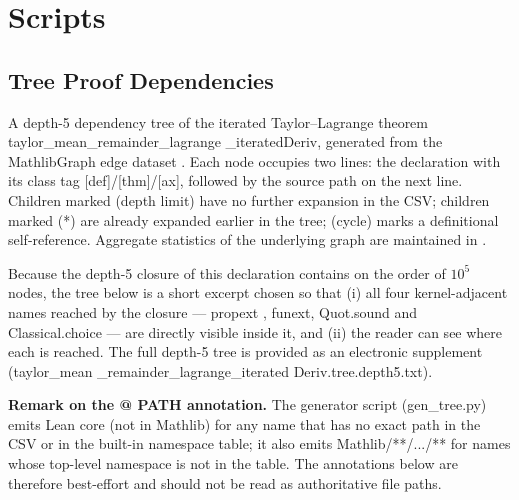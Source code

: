 \documentclass[11pt,reqno]{amsart}
\begin{document}
\section{Scripts}

\label{sec:scripts}

\subsection{Tree Proof Dependencies}

\label{sec:tree}

\noindent A depth-5 dependency tree of the iterated Taylor--Lagrange theorem 
\textsf{taylor\allowbreak\_mean\allowbreak\_remainder\allowbreak\_lagrange%
\allowbreak \_iterated\allowbreak Deriv}, generated from the MathlibGraph
edge dataset \cite{mathlibgraph2026, mathlibgraph, network-structure-mathlib}%
. Each node occupies two lines: the declaration with its class tag \textsf{%
[def]}/\textsf{[thm]}/\textsf{[ax]}, followed by the source path on the next
line. Children marked \textsf{(depth limit)} have no further expansion in
the CSV; children marked \textsf{(*)} are already expanded earlier in the
tree; \textsf{(cycle)} marks a definitional self-reference. Aggregate
statistics of the underlying graph are maintained in \cite{mathlib-stats}.

\noindent Because the depth-5 closure of this declaration contains on the
order of $10^{5}$ nodes, the tree below is a short excerpt chosen so that
(i) all four kernel-adjacent names reached by the closure --- \textsf{propext%
}, \textsf{funext}, \textsf{Quot\allowbreak.sound} and \textsf{%
Classical\allowbreak.choice} --- are directly visible inside it, and (ii)
the reader can see where each is reached. The full depth-5 tree is provided
as an electronic supplement (\textsf{taylor\allowbreak\_mean\allowbreak%
\_remainder\allowbreak\_lagrange\allowbreak\_iterated\allowbreak
Deriv\allowbreak.tree\allowbreak.depth5\allowbreak.txt}).

\noindent\textbf{Remark on the \textsf{@ PATH} annotation.} The generator
script (\textsf{gen\allowbreak\_tree.py}) emits \textsf{Lean core (not in
Mathlib)} for any name that has no exact path in the CSV or in the built-in
namespace table; it also emits \textsf{Mathlib/**/.../**} for names whose
top-level namespace is not in the table. The annotations below are therefore
best-effort and should not be read as authoritative file paths.
\end{document}
